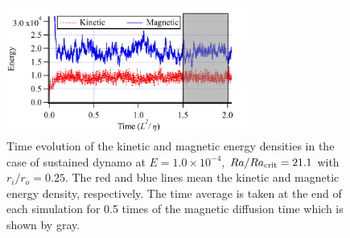 \begin{figure}
\begin{center}
\includegraphics*[width=80mm]{Figures/sph_shell_383_ene.pdf}
\end{center}
\caption{
\color{blue} Time evolution of the kinetic and magnetic energy densities in the case of sustained dynamo at $E = 1.0 \times 10^{-4}$, $Ra / Ra_{\rm crit} = 21.1$ with $r_{i} / r_{o} = 0.25$. The red and blue lines mean the kinetic and magnetic energy density, respectively. The time average is taken at the end of each simulation for 0.5 times of the magnetic diffusion time which is shown by gray.
}
\label{fig:fig_2}
\end{figure}